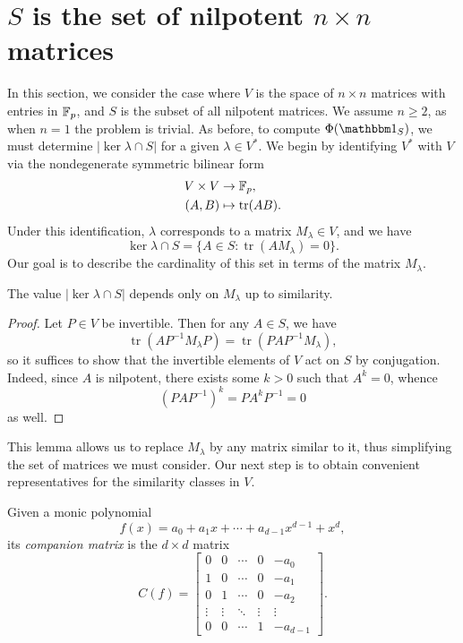 \newcommand{\Mat}{\operatorname{Mat}}
\newcommand{\tr}{\operatorname{tr}}
\newcommand{\fact}{\operatorname{fact}}

\section{$S$ is the set of nilpotent $n\times n$ matrices}

In this section, we consider the case where $V$ is the space of $n\times n$ matrices with entries in $\mathbb{F}_p$, and $S$ is the subset of all nilpotent matrices. We assume $n\ge 2$, as when $n=1$ the problem is trivial. As before, to compute $\Phi(\IND_S)$, we must determine $|\ker\lambda\cap S|$ for a given $\lambda\in V^*$. We begin by identifying $V^*$ with $V$ via the nondegenerate symmetric bilinear form
\begin{align*}
V\times V&\to\F_p,\\
(A,B)&\mapsto\tr(AB).
\end{align*}
Under this identification, $\lambda$ corresponds to a matrix $M_\lambda\in V$, and we have
\begin{equation*}
\ker\lambda\cap S=\{A\in S:\tr(AM_\lambda)=0\}.
\end{equation*}
Our goal is to describe the cardinality of this set in terms of the matrix $M_\lambda$.
\begin{lem}
\label{lem:sim}
The value $|\ker\lambda\cap S|$ depends only on $M_\lambda$ up to similarity.
\end{lem}
\begin{proof}
Let $P\in V$ be invertible. Then for any $A\in S$, we have
\begin{equation*}
\tr(AP^{-1}M_\lambda P)=\tr(PAP^{-1}M_\lambda),
\end{equation*}
so it suffices to show that the invertible elements of $V$ act on $S$ by conjugation. Indeed, since $A$ is nilpotent, there exists some $k>0$ such that $A^k=0$, whence
\begin{equation*}
(PAP^{-1})^k=PA^kP^{-1}=0
\end{equation*}
as well.
\end{proof}
This lemma allows us to replace $M_\lambda$ by any matrix similar to it, thus simplifying the set of matrices we must consider. Our next step is to obtain convenient representatives for the similarity classes in $V$.
\begin{notation}
Given a monic polynomial
\begin{equation*}
f(x)=a_0+a_1x+\cdots+a_{d-1}x^{d-1}+x^d,
\end{equation*}
its \emph{companion matrix} is the $d\times d$ matrix
\begin{equation*}
C(f)=\begin{bmatrix}
0&0&\cdots&0&-a_0\\
1&0&\cdots&0&-a_1\\
0&1&\cdots&0&-a_2\\
\vdots&\vdots&\ddots&\vdots&\vdots\\
0&0&\cdots&1&-a_{d-1}
\end{bmatrix}.
\end{equation*}
\end{notation}
